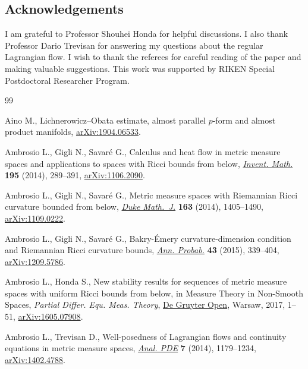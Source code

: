\documentclass[10pt,a4paper]{amsart}
\numberwithin{equation}{section}
\theoremstyle{definition}
\begin{document}
\subsection*{Acknowledgements}
I am grateful to Professor Shouhei Honda for helpful discussions.
I also thank Professor Dario Trevisan for answering my questions about the regular Lagrangian flow.
I wish to thank the \mbox{referees} for careful reading of the paper and making valuable suggestions.
This work was supported by RIKEN Special Postdoctoral Researcher Program.

%
%

\begin{thebibliography}{99}
\footnotesize\itemsep=0pt

Aino M., Lichnerowicz--{O}bata estimate, almost parallel $p$-form and almost
 product manifolds, \href{https://arxiv.org/abs/1904.06533}{arXiv:1904.06533}.

Ambrosio L., Gigli N., Savar\'e G., Calculus and heat flow in metric measure
 spaces and applications to spaces with {R}icci bounds from below,
 \href{https://doi.org/10.1007/s00222-013-0456-1}{\textit{Invent. Math.}} \textbf{195} (2014), 289--391, \href{https://arxiv.org/abs/1106.2090}{arXiv:1106.2090}.

Ambrosio L., Gigli N., Savar\'e G., Metric measure spaces with {R}iemannian
 {R}icci curvature bounded from below, \href{https://doi.org/10.1215/00127094-2681605}{\textit{Duke Math.~J.}} \textbf{163}
 (2014), 1405--1490, \href{https://arxiv.org/abs/1109.0222}{arXiv:1109.0222}.

Ambrosio L., Gigli N., Savar\'e G., Bakry-\'Emery curvature-dimension condition
 and {R}iemannian {R}icci curvature bounds, \href{https://doi.org/10.1214/14-AOP907}{\textit{Ann. Probab.}} \textbf{43}
 (2015), 339--404, \href{https://arxiv.org/abs/1209.5786}{arXiv:1209.5786}.

Ambrosio L., Honda S., New stability results for sequences of metric measure
 spaces with uniform {R}icci bounds from below, in Measure Theory in
 Non-Smooth Spaces, \textit{Partial Differ. Equ. Meas. Theory}, \href{https://doi.org/10.1515/9783110550832-001}{De Gruyter Open},
 Warsaw, 2017, 1--51, \href{https://arxiv.org/abs/1605.07908}{arXiv:1605.07908}.

Ambrosio L., Trevisan D., Well-posedness of {L}agrangian flows and continuity
 equations in metric measure spaces, \href{https://doi.org/10.2140/apde.2014.7.1179}{\textit{Anal. PDE}} \textbf{7} (2014),
 1179--1234, \href{https://arxiv.org/abs/1402.4788}{arXiv:1402.4788}.


\end{thebibliography}
\end{document}
